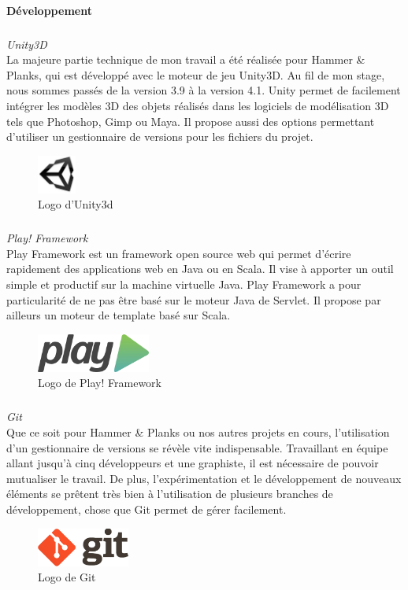 		\paragraph{Développement}
		\subparagraph{} \emph{Unity3D\\}
La majeure partie technique de mon travail a été réalisée pour Hammer \& Planks, qui est développé avec le moteur de jeu Unity3D. Au fil de mon stage, nous sommes passés de la version 3.9 à la version 4.1. Unity permet de facilement intégrer les modèles 3D des objets réalisés dans les logiciels de modélisation 3D tels que Photoshop, Gimp ou Maya. Il propose aussi des options permettant d'utiliser un gestionnaire de versions pour les fichiers du projet.
	\begin{figure}[!h]
		\centering
		\includegraphics[height=48px]{images/unity.jpg}
		\caption{Logo d'Unity3d}
		\label{logo_unity}
	\end{figure}

		\subparagraph{} \emph{Play! Framework\\}
Play Framework est un framework open source web qui permet d'écrire rapidement des applications web en Java ou en Scala. Il vise à apporter un outil simple et productif sur la machine virtuelle Java. Play Framework a pour particularité de ne pas être basé sur le moteur Java de Servlet. Il propose par ailleurs un moteur de template basé sur Scala.
	\begin{figure}[!h]
		\centering
		\includegraphics[height=48px]{images/play.png}
		\caption{Logo de Play! Framework}
		\label{logo_play}
	\end{figure}		

		\subparagraph{} \emph{Git\\}
Que ce soit pour Hammer \& Planks ou nos autres projets en cours, l'utilisation d'un gestionnaire de versions se révèle vite indispensable. Travaillant en équipe allant jusqu'à cinq développeurs et une graphiste, il est nécessaire de pouvoir mutualiser le travail. De plus, l'expérimentation et le développement de nouveaux éléments se prêtent très bien à l'utilisation de plusieurs branches de développement, chose que Git permet de gérer facilement.
	\begin{figure}[!h]
		\centering
		\includegraphics[height=48px]{images/git.png}
		\caption{Logo de Git}
		\label{logo_git}
	\end{figure}

